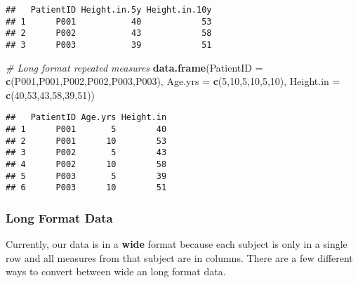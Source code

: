 \documentclass[
]{article}
\newenvironment{Shaded}{\begin{snugshade}}{\end{snugshade}}
\newcommand{\CommentTok}[1]{\textcolor[rgb]{0.56,0.35,0.01}{\textit{#1}}}
\newcommand{\DecValTok}[1]{\textcolor[rgb]{0.00,0.00,0.81}{#1}}
\newcommand{\FunctionTok}[1]{\textcolor[rgb]{0.13,0.29,0.53}{\textbf{#1}}}
\newcommand{\NormalTok}[1]{#1}
\newcommand{\OtherTok}[1]{\textcolor[rgb]{0.56,0.35,0.01}{#1}}
\newcommand{\StringTok}[1]{\textcolor[rgb]{0.31,0.60,0.02}{#1}}
\begin{document}
\begin{verbatim}
##   PatientID Height.in.5y Height.in.10y
## 1      P001           40            53
## 2      P002           43            58
## 3      P003           39            51
\end{verbatim}

\begin{Shaded}
\begin{Highlighting}[]
\CommentTok{\# Long format repeated measures}
\FunctionTok{data.frame}\NormalTok{(}\StringTok{\textquotesingle{}PatientID\textquotesingle{}} \OtherTok{=} \FunctionTok{c}\NormalTok{(}\StringTok{\textquotesingle{}P001\textquotesingle{}}\NormalTok{,}\StringTok{\textquotesingle{}P001\textquotesingle{}}\NormalTok{,}\StringTok{\textquotesingle{}P002\textquotesingle{}}\NormalTok{,}\StringTok{\textquotesingle{}P002\textquotesingle{}}\NormalTok{,}\StringTok{\textquotesingle{}P003\textquotesingle{}}\NormalTok{,}\StringTok{\textquotesingle{}P003\textquotesingle{}}\NormalTok{),}
           \StringTok{\textquotesingle{}Age.yrs\textquotesingle{}} \OtherTok{=} \FunctionTok{c}\NormalTok{(}\DecValTok{5}\NormalTok{,}\DecValTok{10}\NormalTok{,}\DecValTok{5}\NormalTok{,}\DecValTok{10}\NormalTok{,}\DecValTok{5}\NormalTok{,}\DecValTok{10}\NormalTok{),}
           \StringTok{\textquotesingle{}Height.in\textquotesingle{}} \OtherTok{=} \FunctionTok{c}\NormalTok{(}\DecValTok{40}\NormalTok{,}\DecValTok{53}\NormalTok{,}\DecValTok{43}\NormalTok{,}\DecValTok{58}\NormalTok{,}\DecValTok{39}\NormalTok{,}\DecValTok{51}\NormalTok{))}
\end{Highlighting}
\end{Shaded}

\begin{verbatim}
##   PatientID Age.yrs Height.in
## 1      P001       5        40
## 2      P001      10        53
## 3      P002       5        43
## 4      P002      10        58
## 5      P003       5        39
## 6      P003      10        51
\end{verbatim}

\subsubsection{Long Format Data}\label{long-format-data}

Currently, our data is in a \textbf{wide} format because each subject is
only in a single row and all measures from that subject are in columns.
There are a few different ways to convert between wide an long format
data.
\end{document}
